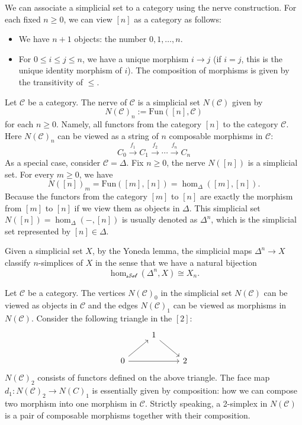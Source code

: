 We can associate a simplicial set to a category using the nerve construction. For each fixed \(n\geq 0\), we can view \([n]\) as a category as follows:
\begin{itemize}
    \item We have \(n+1\) objects: the number \(0,1,\ldots,n\).
    \item For \(0\leq i\leq j\leq n\), we have a unique morphism \(i\rightarrow j\) (if \(i=j\), this is the unique identity morphism of \(i\)). The composition of morphisms is given by the transitivity of \(\leq\).  
\end{itemize}

\begin{example}
    Let \(\mathcal{C}\) be a category. The nerve of \(\mathcal{C}\) is a simplicial set \(N(\mathcal{C})\) given by 
    \[N(\mathcal{C})_n:=\text{Fun}([n],\mathcal{C})\]
    for each \(n\geq 0\). Namely, all functors from the category \([n]\) to the category \(\mathcal{C}\). Here \(N(\mathcal{C})_n\) can be viewed as a string of \(n\) composable morphisms in \(\mathcal{C}\):
    \[C_0\xrightarrow{f_1}C_1\xrightarrow{f_2}\cdots\xrightarrow{f_{n}}C_n\]
    As a special case, consider \(\mathcal{C}=\Delta\). Fix \(n\geq 0\), the nerve \(N([n])\) is a simplicial set. For every \(m\geq 0\), we have 
    \[N([n])_m=\text{Fun}([m],[n])=\hom_\Delta([m],[n]).\]
    Because the functors from the category \([m]\) to \([n]\) are exactly the morphism from \([m]\) to \([n]\) if we view them as objects in \(\Delta\). This simplicial set \(N([n])=\hom_\Delta(-,[n])\) is usually denoted as \(\Delta^n\), which is the simplicial set represented by \([n]\in \Delta\). 

    Given a simplicial set \(X\), by the Yoneda lemma, the simplicial maps \(\Delta^n\rightarrow X\) classify \(n\)-simplices of \(X\) in the sense that we have a natural bijection 
    \[\hom_{\mathcal{sSet}}(\Delta^n,X)\cong X_n.\]
\end{example}

Let \(\mathcal{C}\) be a category. The vertices \(N(\mathcal{C})_0\) in the simplicial set \(N(\mathcal{C})\) can be viewed as objects in \(\mathcal{C}\) and the edges \(N(\mathcal{C})_1\) can be viewed as morphisms in \(N(\mathcal{C})\). Consider the following triangle in the \([2]\):
\[\begin{tikzcd}
	& 1 \\
	0 && 2
	\arrow[from=1-2, to=2-3]
	\arrow[from=2-1, to=1-2]
	\arrow[from=2-1, to=2-3]
\end{tikzcd}\]
\(N(\mathcal{C})_2\) consists of functors defined on the above triangle. The face map \(d_1:N(\mathcal{C})_2\rightarrow N(C)_1\) is essentially given by composition: how we can compose two morphism into one morphism in \(\mathcal{C}\). Strictly speaking, a 2-simplex in \(N(\mathcal{C})\) is a pair of composable morphisms together with their composition. 

